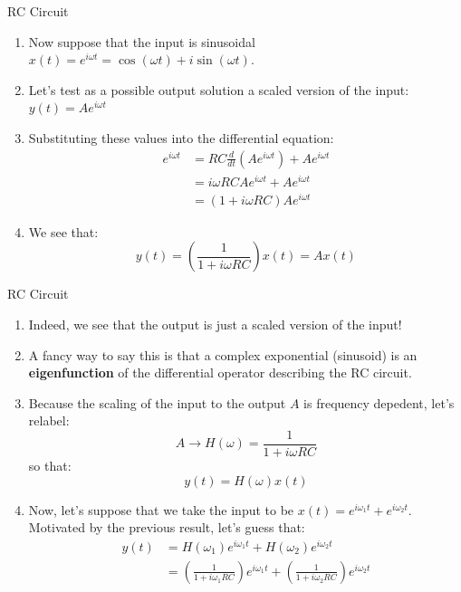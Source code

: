 \documentclass[hyperref={bookmarks=false},aspectratio=169]{beamer}
\begin{document}
	\begin{frame}{RC Circuit}
		\begin{enumerate}
			\item Now suppose that the input is sinusoidal $x(t) = e^{i\omega t} = \cos(\omega t) + i\sin(\omega t)$.
			\item Let's test as a possible output solution a scaled version of the input: $y(t) = Ae^{i\omega t}$
			\item Substituting these values into the differential equation:
				\begin{align}
					e^{i\omega t} &= RC\frac{d}{dt}\left(Ae^{i\omega t}\right) + Ae^{i\omega t} \\
					&= i\omega RC Ae^{i\omega t} + Ae^{i\omega t} \\
					&= (1 + i\omega RC)Ae^{i\omega t}
				\end{align}
			\item We see that:
				\begin{equation}
					y(t) = \left(\frac{1}{1 + i\omega RC}\right) x(t) = Ax(t)
				\end{equation}
		\end{enumerate}
	\end{frame}
	
	\begin{frame}{RC Circuit}
		\begin{enumerate}
			\item Indeed, we see that the output is just a scaled version of the input!
			\item A fancy way to say this is that a complex exponential (sinusoid) is an \textbf{eigenfunction} of the differential operator describing the RC circuit.
			\item Because the scaling of the input to the output $A$ is frequency depedent, let's relabel:
				\begin{equation}
					A \rightarrow H(\omega) = \frac{1}{1 + i\omega RC}
				\end{equation}
			so that:
				\begin{equation}
					y(t) = H(\omega)x(t)
				\end{equation}
			\item Now, let's suppose that we take the input to be $x(t) = e^{i\omega_1 t} + e^{i\omega_2 t}$. Motivated by the previous result, let's guess that:
				\begin{align}
					y(t) &= H(\omega_1)e^{i\omega_1 t} + H(\omega_2)e^{i\omega_2 t} \\
						 &= \left(\frac{1}{1 + i\omega_1 RC}\right)e^{i\omega_1 t} + \left(\frac{1}{1 + i\omega_2 RC}\right)e^{i\omega_2 t}
				\end{align}
		\end{enumerate}
	\end{frame}
	
\end{document}
